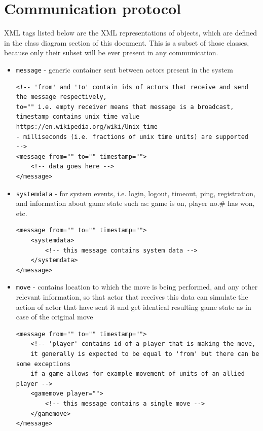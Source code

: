 \documentclass{article}
\begin{document}
\section{Communication protocol}
XML tags listed below are the XML representations of objects, which are defined 
in the class diagram section of this document. This is a subset of those classes,
because only their subset will be ever present in any communication.

\begin{itemize}
  \item \verb|message| - generic container sent between actors present in the system
\begin{verbatim}
<!-- 'from' and 'to' contain ids of actors that receive and send the message respectively,
to="" i.e. empty receiver means that message is a broadcast,
timestamp contains unix time value https://en.wikipedia.org/wiki/Unix_time 
- milliseconds (i.e. fractions of unix time units) are supported
-->
<message from="" to="" timestamp="">
	<!-- data goes here -->
</message>
\end{verbatim}

  \item \verb|systemdata| -  for system events, i.e. login, logout, timeout, ping, registration, 
  and information about game state such as: game is on, player no.\# has won, etc.
\begin{verbatim}
<message from="" to="" timestamp="">
	<systemdata>
		<!-- this message contains system data -->
	</systemdata>
</message>
\end{verbatim}

  \item \verb|move| - contains location to which the move is being performed, and any other relevant information, so that
  actor that receives this data can simulate the action of actor that have sent it and get identical resulting game state
  as in case of the original move
\begin{verbatim}
<message from="" to="" timestamp="">
	<!-- 'player' contains id of a player that is making the move, 
	it generally is expected to be equal to 'from' but there can be some exceptions 
	if a game allows for example movement of units of an allied player -->
	<gamemove player="">
		<!-- this message contains a single move -->
	</gamemove>
</message>
\end{verbatim}


\end{itemize}
\end{document}
